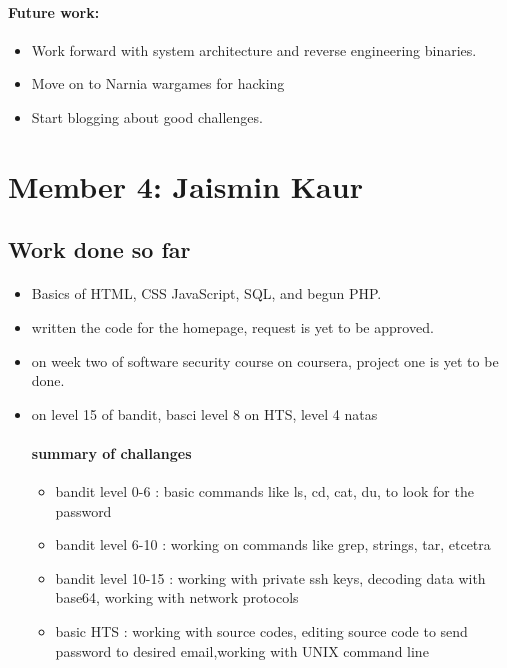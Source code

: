 \documentclass{article}
\begin{document}
\begin{itemize}
\paragraph{Future work:}
\begin{itemize}
    \item Work forward with system architecture and reverse engineering binaries.
    \item Move on to Narnia wargames for hacking
    \item Start blogging about good challenges.
\end{itemize}


\newpage
\section*{Member 4: Jaismin Kaur}
\subsection*{Work done so far}
\paragraph{}
\begin{itemize}
    \item Basics of HTML, CSS JavaScript, SQL, and begun PHP.
    \item written the code for the homepage, request is yet to be approved.
    \item on week two of software security course on coursera, project one is yet to be done.
    \item on level 15 of bandit, basci level 8 on HTS, level 4 natas
\paragraph{summary of challanges} 
\begin{itemize}
    \item bandit level 0-6 : basic commands like ls, cd, cat, du, to look for the password
    \item bandit level 6-10 : working on commands like grep, strings, tar, etcetra
    \item bandit level 10-15 : working with private ssh keys, decoding data with base64, working with network protocols
    \item basic HTS : working with source codes, editing source code to send password to desired email,working with UNIX command line

\end{itemize}
\end{itemize}
\end{itemize}
\end{document}
